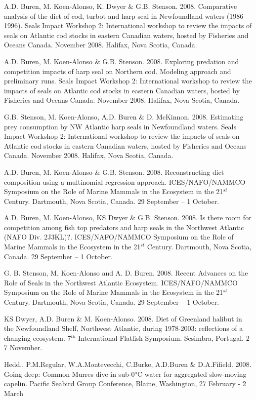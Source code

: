 \documentclass{res}
\begin{document}
\begin{resume}
\begin{hangparas}{.4in}{1}
A.D. Buren, M. Koen-Alonso, K. Dwyer \& G.B. Stenson. 2008. Comparative analysis of the diet of cod, turbot and harp seal in Newfoundland waters (1986-1996). Seals Impact Workshop 2: International workshop to review the impacts of seals on Atlantic cod stocks in eastern Canadian waters, hosted by Fisheries and Oceans Canada. November 2008. Halifax, Nova Scotia, Canada.

A.D. Buren, M. Koen-Alonso \& G.B. Stenson. 2008. Exploring predation and competition impacts of harp seal on Northern cod. Modeling approach and preliminary runs. Seals Impact Workshop 2: International workshop to review the impacts of seals on Atlantic cod stocks in eastern Canadian waters, hosted by Fisheries and Oceans Canada. November 2008. Halifax, Nova Scotia, Canada.

G.B. Stenson, M. Koen-Alonso, A.D. Buren \& D. McKinnon. 2008. Estimating prey consumption by NW Atlantic harp seals in Newfoundland waters. Seals Impact Workshop 2: International workshop to review the impacts of seals on Atlantic cod stocks in eastern Canadian waters, hosted by Fisheries and Oceans Canada. November 2008. Halifax, Nova Scotia, Canada.

A.D. Buren, M. Koen-Alonso \& G.B. Stenson. 2008. Reconstructing diet composition using a multinomial regression approach. ICES/NAFO/NAMMCO Symposium on the Role of Marine Mammals in the Ecosystem in the 21$^{st}$ Century. Dartmouth, Nova Scotia, Canada. 29 September – 1 October.

A.D. Buren, M. Koen-Alonso, KS Dwyer \& G.B. Stenson. 2008. Is there room for competition among fish top predators and harp seals in the Northwest Atlantic (NAFO Div. 2J3KL)?. ICES/NAFO/NAMMCO Symposium on the Role of Marine Mammals in the Ecosystem in the 21$^{st}$ Century. Dartmouth, Nova Scotia, Canada. 29 September – 1 October.

G. B. Stenson, M. Koen-Alonso and A. D. Buren. 2008. Recent Advances on the Role of Seals in the Northwest Atlantic Ecosystem. ICES/NAFO/NAMMCO Symposium on the Role of Marine Mammals in the Ecosystem in the 21$^{st}$ Century. Dartmouth, Nova Scotia, Canada. 29 September – 1 October.

KS Dwyer, A.D. Buren \& M. Koen-Alonso. 2008. Diet of Greenland halibut in the Newfoundland Shelf, Northwest Atlantic, during 1978-2003: reflections of a changing ecosystem. 7$^{th}$ International Flatfish Symposium. Sesimbra, Portugal. 2-7 November.

Hedd., P.M.Regular, W.A.Montevecchi, C.Burke, A.D.Buren \& D.A.Fifield. 2008. Going deep: Common Murres dive in sub-0$^{o}$C water for aggregated slow-moving capelin. Pacific Seabird Group Conference, Blaine, Washington, 27 February - 2 March


\end{hangparas}
\end{resume}
\end{document}

